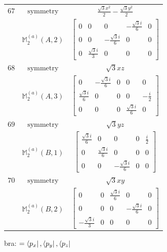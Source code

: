 \documentclass[fleqn,8pt,landscape]{jsarticle}
\begin{document}
\begin{longtable}{ccc}
$ 67 $ & $ \text{symmetry} $ & $ \frac{\sqrt{3} x^{2}}{2} - \frac{\sqrt{3} y^{2}}{2} $ \\
$  $ & $ \mathbb{M}_{2}^{(a)}(A,2) $ & $ \begin{bmatrix} 0 & 0 & 0 & - \frac{\sqrt{3} i}{6} & 0 \\ 0 & 0 & - \frac{\sqrt{3} i}{6} & 0 & 0 \\ 0 & \frac{\sqrt{3} i}{3} & 0 & 0 & 0 \end{bmatrix} $ \\ \hline
$ 68 $ & $ \text{symmetry} $ & $ \sqrt{3} x z $ \\
$  $ & $ \mathbb{M}_{2}^{(a)}(A,3) $ & $ \begin{bmatrix} 0 & - \frac{\sqrt{3} i}{6} & 0 & 0 & 0 \\ \frac{\sqrt{3} i}{6} & 0 & 0 & 0 & - \frac{i}{2} \\ 0 & 0 & 0 & \frac{\sqrt{3} i}{6} & 0 \end{bmatrix} $ \\ \hline
$ 69 $ & $ \text{symmetry} $ & $ \sqrt{3} y z $ \\
$  $ & $ \mathbb{M}_{2}^{(a)}(B,1) $ & $ \begin{bmatrix} \frac{\sqrt{3} i}{6} & 0 & 0 & 0 & \frac{i}{2} \\ 0 & \frac{\sqrt{3} i}{6} & 0 & 0 & 0 \\ 0 & 0 & - \frac{\sqrt{3} i}{6} & 0 & 0 \end{bmatrix} $ \\ \hline
$ 70 $ & $ \text{symmetry} $ & $ \sqrt{3} x y $ \\
$  $ & $ \mathbb{M}_{2}^{(a)}(B,2) $ & $ \begin{bmatrix} 0 & 0 & \frac{\sqrt{3} i}{6} & 0 & 0 \\ 0 & 0 & 0 & - \frac{\sqrt{3} i}{6} & 0 \\ - \frac{\sqrt{3} i}{3} & 0 & 0 & 0 & 0 \end{bmatrix} $ \\ \hline
\end{longtable}
bra: $=\bra{p_{x}}, \bra{p_{y}}, \bra{p_{z}}$
\end{document}
